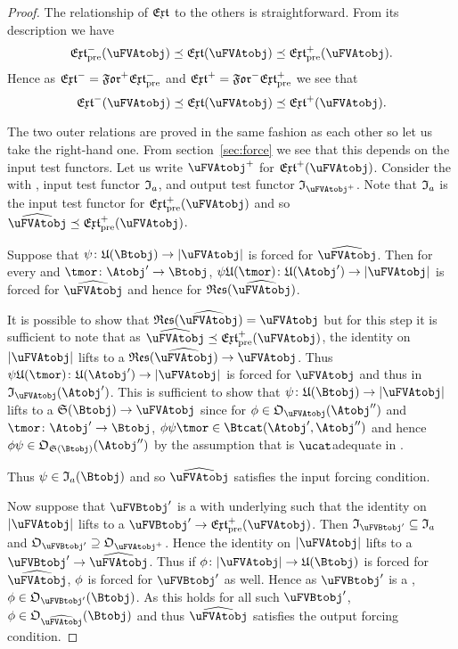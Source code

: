 \documentclass[%
a4paper,%
arxiv,%
defaults
]{myclass}
\begin{document}
\begin{proof}
The relationship of \(\extfunc\) to the others is straightforward.
From its description we have
%
\[
  \PMextfunc(\uFVAtobj) \preceq \extfunc(\uFVAtobj) \preceq \PJextfunc(\uFVAtobj).
\]
%
Hence as \(\Mextfunc = \Mforfunc \PMextfunc\) and \(\Jextfunc = \Jforfunc \PJextfunc\) we see that
%
\[
  \Mextfunc(\uFVAtobj) \preceq \extfunc(\uFVAtobj) \preceq \Jextfunc(\uFVAtobj).
\]

The two outer relations are proved in the same fashion as each other so let us take the right\hyp{}hand one.
From section~\ref{sec:force} we see that this depends on the input test functors.
Let us write \(\mMo{\uFVAtobj}\) for \(\Jextfunc(\uFVAtobj)\).
Consider the \uVBtobj[\widehat{\uFVAtobj}] with \uobj[{\forfunc[\uFVAtobj]}], input test functor \(\itest_a\), and output test functor \(\itest_{\mMo{\uFVAtobj}}\).
Note that \(\itest_a\) is the input test functor for \(\PJextfunc(\uFVAtobj)\) and so \(\widehat{\uFVAtobj} \preceq \PJextfunc(\uFVAtobj)\).

Suppose that \(\ifn \colon \ufunc(\Btobj) \to \forfunc[\uFVAtobj]\) is forced for \(\widehat{\uFVAtobj}\).
Then for every \Atobj[\Atobj'] and \tmor \(\tmor \colon \Atobj' \to \Btobj\), \(\ifn \ufunc(\tmor) \colon \ufunc(\Atobj') \to \forfunc[\uFVAtobj]\) is forced for \(\widehat{\uFVAtobj}\) and hence for \(\resfunc(\widehat{\uFVAtobj})\).

It is possible to show that \(\resfunc(\widehat{\uFVAtobj}) = \uFVAtobj\) but for this step it is sufficient to note that as \(\widehat{\uFVAtobj} \preceq \PJextfunc(\uFVAtobj)\), the identity on \(\forfunc[\uFVAtobj]\) lifts to a \uFVAtmor \(\resfunc(\widehat{\uFVAtobj}) \to \uFVAtobj\).
Thus \(\ifn \ufunc(\tmor) \colon \ufunc(\Atobj') \to \forfunc[\uFVAtobj]\) is forced for \(\uFVAtobj\) and thus in \(\itest_{\uFVAtobj}(\Atobj')\).
This is sufficient to show that \(\ifn \colon \ufunc(\Btobj) \to \forfunc[\uFVAtobj]\) lifts to a \uVAtmor \(\sfunc(\Btobj) \to \uFVAtobj\) since for \(\ofn \in \otest_{\uFVAtobj}(\Atobj'')\) and \(\tmor \colon \Atobj' \to \Btobj\), \(\ofn \ifn \tmor \in \Hom{\Btcat}{\Atobj'}{\Atobj''}\) and hence \(\ofn \ifn \in \otest_{\sfunc(\Btobj)}(\Atobj'')\) by the assumption that \Atcat is \(\ucat\)\enhyp{}adequate in \Btcat.

Thus \(\ifn \in \itest_a(\Btobj)\) and so \(\widehat{\uFVAtobj}\) satisfies the input forcing condition.

Now suppose that \(\uFVBtobj'\) is a \uFVBtobj with underlying \uobj[{\forfunc[\uFVAtobj]}] such that the identity on \(\forfunc[\uFVAtobj]\) lifts to a \uVBtmor \(\uFVBtobj' \to \PJextfunc(\uFVAtobj)\).
Then \(\itest_{\uFVBtobj'} \subseteq \itest_a\) and \(\otest_{\uFVBtobj'} \supseteq \otest_{\mMo{\uFVAtobj}}\).
Hence the identity on \(\forfunc[\uFVAtobj]\) lifts to a \uVBtmor \(\uFVBtobj' \to \widehat{\uFVAtobj}\).
Thus if \(\ofn \colon \forfunc[\uFVAtobj] \to \ufunc(\Btobj)\) is forced for \(\widehat{\uFVAtobj}\), \(\phi\) is forced for \(\uFVBtobj'\) as well.
Hence as \(\uFVBtobj'\) is a \uFVBtobj, \(\ofn \in \otest_{\uFVBtobj'}(\Btobj)\).
As this holds for all such \(\uFVBtobj'\), \(\ofn \in \otest_{\widehat{\uFVAtobj}}(\Btobj)\) and thus \(\widehat{\uFVAtobj}\) satisfies the output forcing condition.


\end{proof}
\end{document}
